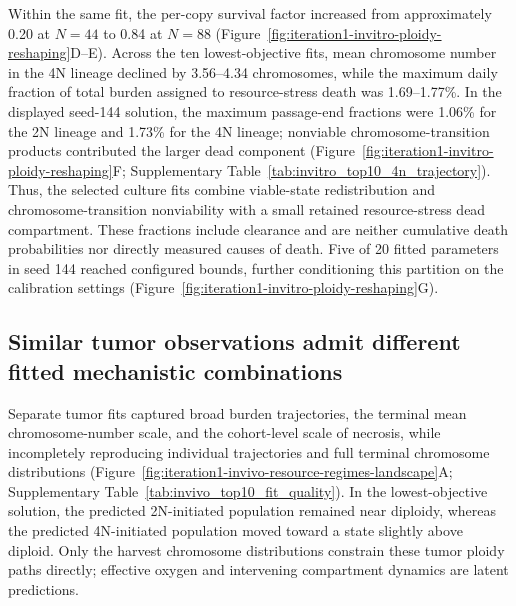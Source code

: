 \documentclass[11pt]{article}
\begin{document}
Within the same fit, the per-copy survival factor increased from approximately 0.20 at $N=44$ to 0.84 at $N=88$ (Figure~\ref{fig:iteration1-invitro-ploidy-reshaping}D--E). Across the ten lowest-objective fits, mean chromosome number in the 4N lineage declined by 3.56--4.34 chromosomes, while the maximum daily fraction of total burden assigned to resource-stress death was 1.69--1.77\%. In the displayed seed-144 solution, the maximum passage-end fractions were 1.06\% for the 2N lineage and 1.73\% for the 4N lineage; nonviable chromosome-transition products contributed the larger dead component (Figure~\ref{fig:iteration1-invitro-ploidy-reshaping}F; Supplementary Table~\ref{tab:invitro_top10_4n_trajectory}). Thus, the selected culture fits combine viable-state redistribution and chromosome-transition nonviability with a small retained resource-stress dead compartment. These fractions include clearance and are neither cumulative death probabilities nor directly measured causes of death. Five of 20 fitted parameters in seed 144 reached configured bounds, further conditioning this partition on the calibration settings (Figure~\ref{fig:iteration1-invitro-ploidy-reshaping}G).

\subsection*{Similar tumor observations admit different fitted mechanistic combinations}

Separate tumor fits captured broad burden trajectories, the terminal mean chromosome-number scale, and the cohort-level scale of necrosis, while incompletely reproducing individual trajectories and full terminal chromosome distributions (Figure~\ref{fig:iteration1-invivo-resource-regimes-landscape}A; Supplementary Table~\ref{tab:invivo_top10_fit_quality}). In the lowest-objective solution, the predicted 2N-initiated population remained near diploidy, whereas the predicted 4N-initiated population moved toward a state slightly above diploid. Only the harvest chromosome distributions constrain these tumor ploidy paths directly; effective oxygen and intervening compartment dynamics are latent predictions.
\end{document}
